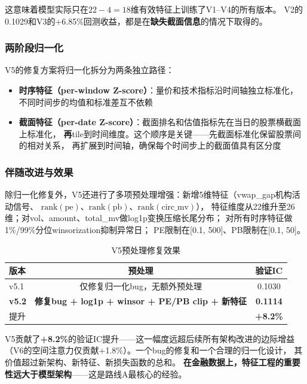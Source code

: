 \documentclass[12pt,a4paper]{ctexart}
\begin{document}
这意味着模型实际只在$22-4=18$维有效特征上训练了V1--V4的所有版本。
V2的0.1029和V3的+6.85\%回测收益，都是在\textbf{缺失截面信息}的情况下取得的。

\subsubsection{两阶段归一化}

V5的修复方案将归一化拆分为两条独立路径：

\begin{itemize}[leftmargin=*]
    \item \textbf{时序特征（per-window Z-score）}：量价和技术指标沿时间轴独立标准化，
          不同时间步的均值和标准差互不依赖
    \item \textbf{截面特征（per-date Z-score）}：截面排名和估值指标先在当日的股票横截面上标准化，
          \textbf{再}tile到时间维度。这个顺序是关键——先截面标准化保留股票间的相对关系，
          再扩展到时间轴，确保每个时间步上的截面值具有区分度
\end{itemize}

\subsubsection{伴随改进与效果}

除归一化修复外，V5还进行了多项预处理增强：新增5维特征（vwap\_gap机构活动信号、
$\text{rank}(\text{pe})$、$\text{rank}(\text{pb})$、$\text{rank}(\text{circ\_mv})$），
特征维度从22维升至26维；对vol、amount、total\_mv做log1p变换压缩长尾分布；
对所有时序特征做1\%/99\%分位winsorization抑制异常日；
PE限制在[0.1, 500]、PB限制在[0.1, 50]。

\begin{table}[htbp]
\centering
\caption{V5预处理修复效果}
\label{tab:v5_improvement}
\begin{tabular}{lcc}
\toprule
版本 & 预处理 & 验证IC \\
\midrule
v5.1 & 仅修复归一化bug，无额外预处理 & 0.1030 \\
\textbf{v5.2} & \textbf{修复bug + log1p + winsor + PE/PB clip + 新特征} & \textbf{0.1114} \\
\midrule
提升 & & \textbf{+8.2\%} \\
\bottomrule
\end{tabular}
\end{table}

V5贡献了\textbf{+8.2\%}的验证IC提升——这一幅度远超后续所有架构改进的边际增益
（V6的空间注意力仅贡献+1.8\%）。一个bug的修复和一个合理的归一化设计，
其价值超过新架构、新特征、新损失函数的总和。
\textbf{在金融数据上，特征工程的重要性远大于模型架构}——这是路线A最核心的经验。
\end{document}
